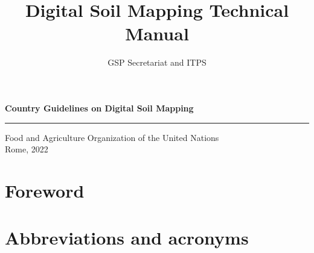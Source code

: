 \documentclass[
  10pt,
  b5paper,
  oneside]{book}
\title{Digital Soil Mapping Technical Manual}
\author{GSP Secretariat and ITPS}
\date{}
\newcommand\blankpage{%
    \null
    \thispagestyle{empty}%
    \addtocounter{page}{-1}%
    \newpage}
\begin{document}
\maketitle

\pagestyle{plain}

\afterpage{\blankpage}
\thispagestyle{empty}
\begin{titlepage}
    \begin{center}
        \vspace*{4cm}
        \Large

        \textcolor{astral}{\textbf{Country Guidelines on Digital Soil Mapping\\}}
        \vspace{0.5cm}
        \normalsize
        \vfill
        \noindent
        {\color{astral}\rule{\linewidth}{0.5mm} }

        Food and Agriculture Organization of the United Nations\\
	Rome, 2022
    \end{center}
\end{titlepage}



\frontmatter
{}   
\tableofcontents
\listoffigures
\listoftables
\nopagebreak[4]

\hypertarget{foreword}{%
\chapter*{Foreword}\label{foreword}}

\hypertarget{abbreviations-and-acronyms}{%
\chapter*{Abbreviations and acronyms}\label{abbreviations-and-acronyms}}
\end{document}
